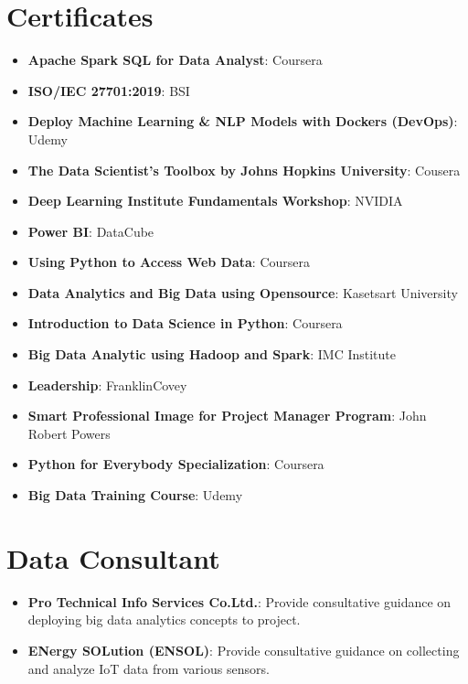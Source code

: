 \documentclass[letterpaper,11pt]{article}
\newcommand{\resumeItem}[2]{
  \item\small{
    \textbf{#1}{: #2 \vspace{-2pt}}
  }
}
\newcommand{\resumeSubItem}[2]{\resumeItem{#1}{#2}\vspace{-4pt}}
\newcommand{\resumeSubHeadingListStart}{\begin{itemize}[leftmargin=*]}
\newcommand{\resumeSubHeadingListEnd}{\end{itemize}}
\begin{document}
\begin{refsection}
  \nocite{book2013}
  \nocite{book2013a}
  \nocite{book2012}
  \nocite{book2012a}
  \nocite{book2012b}
  \nocite{book2007}
  \nocite{kerdsri2003snmp}
	\AtNextBibliography{\small}
	\printbibliography[title={Books}]
\end{refsection}

\section{Certificates}
  \resumeSubHeadingListStart
  \resumeSubItem{Apache Spark SQL for Data Analyst}{Coursera}
  \resumeSubItem{ISO/IEC 27701:2019}{BSI}
  \resumeSubItem{Deploy Machine Learning \& NLP Models with Dockers (DevOps)}{Udemy}
  \resumeSubItem{The Data Scientist’s Toolbox by Johns Hopkins University}{Cousera}
  \resumeSubItem{Deep Learning Institute Fundamentals Workshop}{NVIDIA}
  \resumeSubItem{Power BI}{DataCube}
  \resumeSubItem{Using Python to Access Web Data}{Coursera}  
  \resumeSubItem{Data Analytics and Big Data using Opensource}{Kasetsart University}
  \resumeSubItem{Introduction to Data Science in Python}{Coursera}   
  \resumeSubItem{Big Data Analytic using Hadoop and Spark}{IMC Institute}
  \resumeSubItem{Leadership}{FranklinCovey}
  \resumeSubItem{Smart Professional Image for Project Manager Program}{John Robert Powers}
  \resumeSubItem{Python for Everybody Specialization}{Coursera}
  \resumeSubItem{Big Data Training Course}{Udemy}         
  \resumeSubHeadingListEnd


  \section{Data Consultant}
  \resumeSubHeadingListStart
  \resumeSubItem{Pro Technical Info Services Co.Ltd.}{Provide consultative guidance on deploying big data analytics concepts to project.}
  \resumeSubItem{ENergy SOLution (ENSOL)}{Provide consultative guidance on collecting and analyze IoT data from various sensors.}     
  \resumeSubHeadingListEnd

\end{document}
